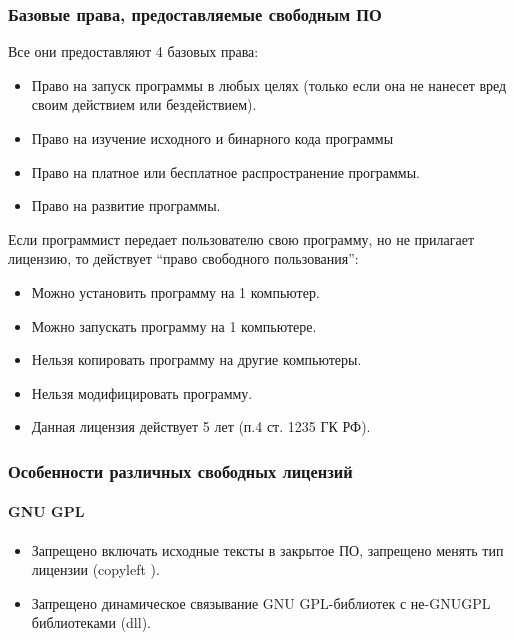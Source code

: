 \subsubsection{Базовые права, предоставляемые свободным ПО}\label{subsubsec:free-software-basic-rights}

\noindent
Все они предоставляют 4 базовых права:

\begin{itemize}
    \item Право на запуск программы в любых целях (только если она не нанесет вред своим действием или бездействием).
    \item Право на изучение исходного и бинарного кода программы
    \item Право на платное или бесплатное распространение программы.
    \item Право на развитие программы.
\end{itemize}

\noindent
Если программист передает пользователю свою программу, но не прилагает лицензию, то действует \enquote{право свободного пользования}:

\begin{itemize}
    \item Можно установить программу на 1 компьютер.
    \item Можно запускать программу на 1 компьютере.
    \item Нельзя копировать программу на другие компьютеры.
    \item Нельзя модифицировать программу.
    \item Данная лицензия действует 5 лет (п.4 ст. 1235 ГК РФ).
\end{itemize}

\subsubsection{Особенности различных свободных лицензий}\label{subsubsec:free-software-licenses-features}

\paragraph*{GNU GPL}
\begin{itemize}
    \item Запрещено включать исходные тексты в закрытое ПО, запрещено менять тип лицензии (copyleft \textcopyleft).
    \item Запрещено динамическое связывание GNU GPL-библиотек с не-GNUGPL библиотеками (dll).
\end{itemize}

